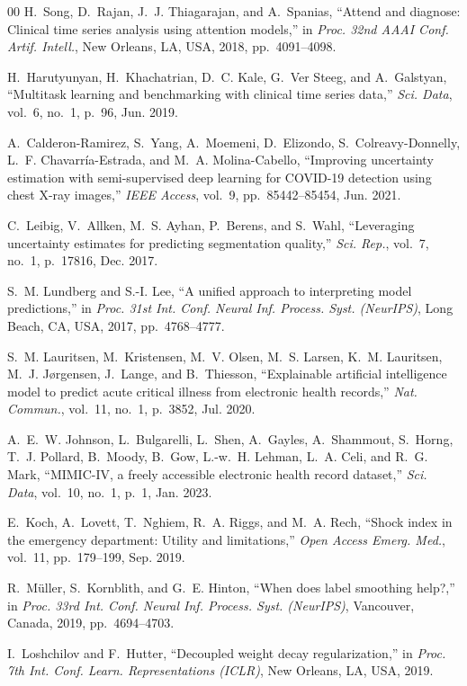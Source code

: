 \documentclass[conference]{IEEEtran}
\begin{document}
\begin{thebibliography}{00}
H.~Song, D.~Rajan, J.~J. Thiagarajan, and A.~Spanias, ``Attend and diagnose: Clinical time series analysis using attention models,'' in \textit{Proc. 32nd AAAI Conf. Artif. Intell.}, New Orleans, LA, USA, 2018, pp.~4091--4098.

H.~Harutyunyan, H.~Khachatrian, D.~C. Kale, G.~Ver Steeg, and A.~Galstyan, ``Multitask learning and benchmarking with clinical time series data,'' \textit{Sci. Data}, vol.~6, no.~1, p.~96, Jun. 2019.

A.~Calderon-Ramirez, S.~Yang, A.~Moemeni, D.~Elizondo, S.~Colreavy-Donnelly, L.~F. Chavarr\'{i}a-Estrada, and M.~A. Molina-Cabello, ``Improving uncertainty estimation with semi-supervised deep learning for COVID-19 detection using chest X-ray images,'' \textit{IEEE Access}, vol.~9, pp.~85442--85454, Jun. 2021.

C.~Leibig, V.~Allken, M.~S. Ayhan, P.~Berens, and S.~Wahl, ``Leveraging uncertainty estimates for predicting segmentation quality,'' \textit{Sci. Rep.}, vol.~7, no.~1, p.~17816, Dec. 2017.

S.~M. Lundberg and S.-I. Lee, ``A unified approach to interpreting model predictions,'' in \textit{Proc. 31st Int. Conf. Neural Inf. Process. Syst. (NeurIPS)}, Long Beach, CA, USA, 2017, pp.~4768--4777.

S.~M. Lauritsen, M.~Kristensen, M.~V. Olsen, M.~S. Larsen, K.~M. Lauritsen, M.~J. J{\o}rgensen, J.~Lange, and B.~Thiesson, ``Explainable artificial intelligence model to predict acute critical illness from electronic health records,'' \textit{Nat. Commun.}, vol.~11, no.~1, p.~3852, Jul. 2020.

A.~E.~W. Johnson, L.~Bulgarelli, L.~Shen, A.~Gayles, A.~Shammout, S.~Horng, T.~J. Pollard, B.~Moody, B.~Gow, L.-w.~H. Lehman, L.~A. Celi, and R.~G. Mark, ``MIMIC-IV, a freely accessible electronic health record dataset,'' \textit{Sci. Data}, vol.~10, no.~1, p.~1, Jan. 2023.

E.~Koch, A.~Lovett, T.~Nghiem, R.~A. Riggs, and M.~A. Rech, ``Shock index in the emergency department: Utility and limitations,'' \textit{Open Access Emerg. Med.}, vol.~11, pp.~179--199, Sep. 2019.

R.~M\"{u}ller, S.~Kornblith, and G.~E. Hinton, ``When does label smoothing help?,'' in \textit{Proc. 33rd Int. Conf. Neural Inf. Process. Syst. (NeurIPS)}, Vancouver, Canada, 2019, pp.~4694--4703.

I.~Loshchilov and F.~Hutter, ``Decoupled weight decay regularization,'' in \textit{Proc. 7th Int. Conf. Learn. Representations (ICLR)}, New Orleans, LA, USA, 2019.

\end{thebibliography}
\end{document}
